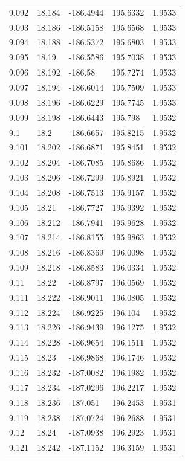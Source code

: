 \begin{tabular}{lllll}
9.092 & 18.184 & -186.4944 & 195.6332 & 1.9533 \\
9.093 & 18.186 & -186.5158 & 195.6568 & 1.9533 \\
9.094 & 18.188 & -186.5372 & 195.6803 & 1.9533 \\
9.095 & 18.19 & -186.5586 & 195.7038 & 1.9533 \\
9.096 & 18.192 & -186.58 & 195.7274 & 1.9533 \\
9.097 & 18.194 & -186.6014 & 195.7509 & 1.9533 \\
9.098 & 18.196 & -186.6229 & 195.7745 & 1.9533 \\
9.099 & 18.198 & -186.6443 & 195.798 & 1.9532 \\
9.1 & 18.2 & -186.6657 & 195.8215 & 1.9532 \\
9.101 & 18.202 & -186.6871 & 195.8451 & 1.9532 \\
9.102 & 18.204 & -186.7085 & 195.8686 & 1.9532 \\
9.103 & 18.206 & -186.7299 & 195.8921 & 1.9532 \\
9.104 & 18.208 & -186.7513 & 195.9157 & 1.9532 \\
9.105 & 18.21 & -186.7727 & 195.9392 & 1.9532 \\
9.106 & 18.212 & -186.7941 & 195.9628 & 1.9532 \\
9.107 & 18.214 & -186.8155 & 195.9863 & 1.9532 \\
9.108 & 18.216 & -186.8369 & 196.0098 & 1.9532 \\
9.109 & 18.218 & -186.8583 & 196.0334 & 1.9532 \\
9.11 & 18.22 & -186.8797 & 196.0569 & 1.9532 \\
9.111 & 18.222 & -186.9011 & 196.0805 & 1.9532 \\
9.112 & 18.224 & -186.9225 & 196.104 & 1.9532 \\
9.113 & 18.226 & -186.9439 & 196.1275 & 1.9532 \\
9.114 & 18.228 & -186.9654 & 196.1511 & 1.9532 \\
9.115 & 18.23 & -186.9868 & 196.1746 & 1.9532 \\
9.116 & 18.232 & -187.0082 & 196.1982 & 1.9532 \\
9.117 & 18.234 & -187.0296 & 196.2217 & 1.9532 \\
9.118 & 18.236 & -187.051 & 196.2453 & 1.9531 \\
9.119 & 18.238 & -187.0724 & 196.2688 & 1.9531 \\
9.12 & 18.24 & -187.0938 & 196.2923 & 1.9531 \\
9.121 & 18.242 & -187.1152 & 196.3159 & 1.9531 \\

\end{tabular}
